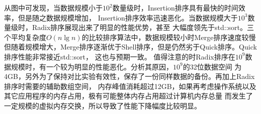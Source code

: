 \documentclass[a4paper]{article}
\begin{document}
\begin{enumerate}
\begin{center}
  \end{center}
  从图中可发现，当数据规模小于$10^2$数量级时，Insertion排序具有最快的时间效率，但是随之数据规模增加，
  Insertion排序效率迅速恶化。当数据规模大于$10^3$数量级时，Radix排序展现出来了明显的性能优势，甚至
  大幅度领先于std::sort。三个平均复杂度$O(n\lg n)$的比较排序算法中，数据规模较小时Merge排序速度较慢
  但随着规模增大，Merge排序逐渐优于Shell排序，但是仍然劣于Quick排序。Quick排序性能非常接近std::sort，
  这也与预期一致。
  值得注意的时Radix排序在$10^9$数据规模时，有一个较为明显的性能恶化。分析其原因，$10^9$的32位数据空间
  为4GB，另外为了保持对比实验有效性，保存了一份同样数据的备份。再加上Radix排序时需要的辅助数组空间，
  内存峰值消耗超过12GB，如果再考虑操作系统以及其它应用程序的内存占用，极有可能整体内存占用超过计算机内存总量
  而发生了一定规模的虚拟内存交换，所以导致了性能下降幅度比较明显。
\end{enumerate}
\end{document}
